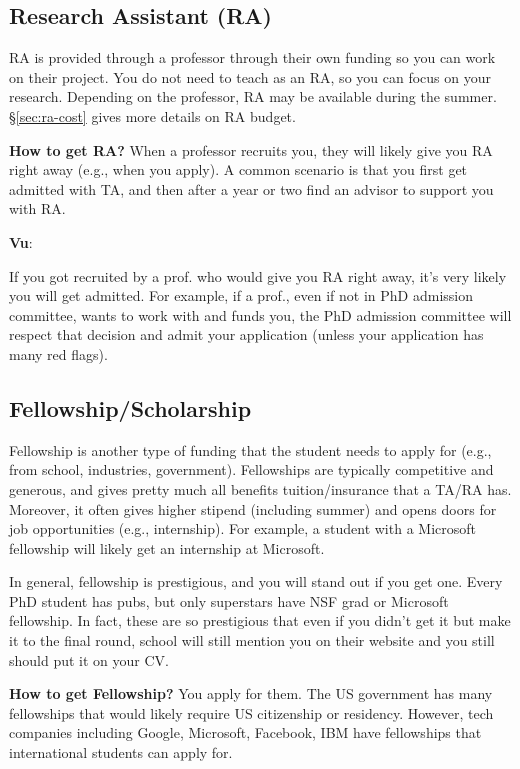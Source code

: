 \documentclass[11pt]{article}
\newenvironment{commentbox}[1][]{
\small
    \begin{cbox}
    \textbf{#1}: 
 }{
   \end{cbox}
}
\begin{document}
\subsection{Research Assistant (RA)}
RA is provided through a professor through their own funding so you can work on their project.  
You do not need to teach as an RA, so you can focus on your research. Depending on the professor, RA may be available during the summer. \S\ref{sec:ra-cost} gives more details on RA budget.

\textbf{How to get RA?} When a professor recruits you, they will likely give you RA right away (e.g., when you apply).  A common scenario is that you first get admitted with TA, and then after a year or two find an advisor to support you with RA. 


\begin{commentbox}[Vu]
If you got recruited by a prof. who would give you RA right away, it's very likely you will get admitted.  For example, if a prof., even if not in PhD admission committee, wants to work with and funds you, the PhD admission committee will respect that decision and admit your application (unless your application has many red flags).
\end{commentbox}

\subsection{Fellowship/Scholarship}

Fellowship is another type of funding that the student needs to apply for (e.g., from school, industries, government). Fellowships are typically competitive and generous, and gives pretty much all benefits tuition/insurance that a TA/RA has.  Moreover, it often gives higher stipend (including summer) and opens doors for job opportunities (e.g., internship).  For example, a student with a Microsoft fellowship will likely get an internship at Microsoft.  

In general, fellowship is prestigious, and you will stand out if you get one.  Every PhD student has pubs, but only superstars have NSF grad or Microsoft fellowship. In fact, these are so prestigious that even if you didn't get it but make it to the final round, school will still mention you on their website and you still should put it on your CV.


\textbf{How to get Fellowship?} You apply for them.  The US government has many fellowships that would likely require US citizenship or residency.  However, tech companies including Google, Microsoft, Facebook, IBM have fellowships that international students can apply for. 
\end{document}
